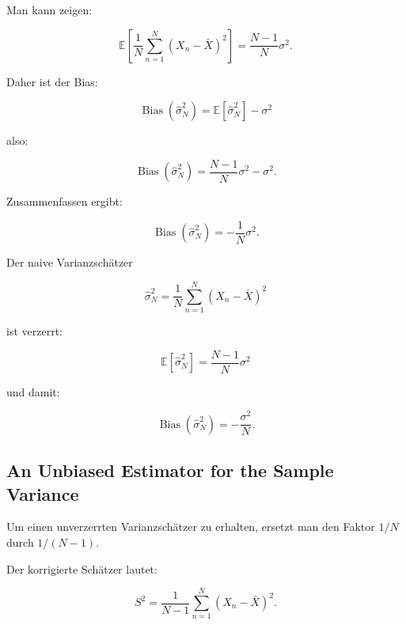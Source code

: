 \documentclass[11pt,a4paper]{scrartcl}
\begin{document}
\begin{calculationbox}
    Man kann zeigen:

    \[
        \mathbb{E}
        \left[
            \frac{1}{N}
            \sum_{n=1}^{N}
            (X_n-\bar X)^2
        \right]
        =
        \frac{N-1}{N}
        \sigma^2.
    \]

    Daher ist der Bias:

    \[
        \operatorname{Bias}(\hat\sigma_N^2)
        =
        \mathbb{E}[\hat\sigma_N^2]-\sigma^2
    \]

    also:

    \[
        \operatorname{Bias}(\hat\sigma_N^2)
        =
        \frac{N-1}{N}\sigma^2-\sigma^2.
    \]

    Zusammenfassen ergibt:

    \[
        \operatorname{Bias}(\hat\sigma_N^2)
        =
        -\frac{1}{N}\sigma^2.
    \]
\end{calculationbox}

\begin{answerbox}
    Der naive Varianzschätzer

    \[
        \boxed{
            \hat\sigma_N^2
            =
            \frac{1}{N}
            \sum_{n=1}^{N}
            (X_n-\bar X)^2
        }
    \]

    ist verzerrt:

    \[
        \boxed{
            \mathbb{E}[\hat\sigma_N^2]
            =
            \frac{N-1}{N}\sigma^2
        }
    \]

    und damit:

    \[
        \boxed{
            \operatorname{Bias}(\hat\sigma_N^2)
            =
            -\frac{\sigma^2}{N}.
        }
    \]
\end{answerbox}

\subsection{An Unbiased Estimator for the Sample Variance}

\begin{notebox}
    Um einen unverzerrten Varianzschätzer zu erhalten, ersetzt man den Faktor
    \(1/N\) durch \(1/(N-1)\).

    Der korrigierte Schätzer lautet:

    \[
        S^2
        =
        \frac{1}{N-1}
        \sum_{n=1}^{N}
        (X_n-\bar X)^2.
    \]
\end{notebox}
\end{document}
